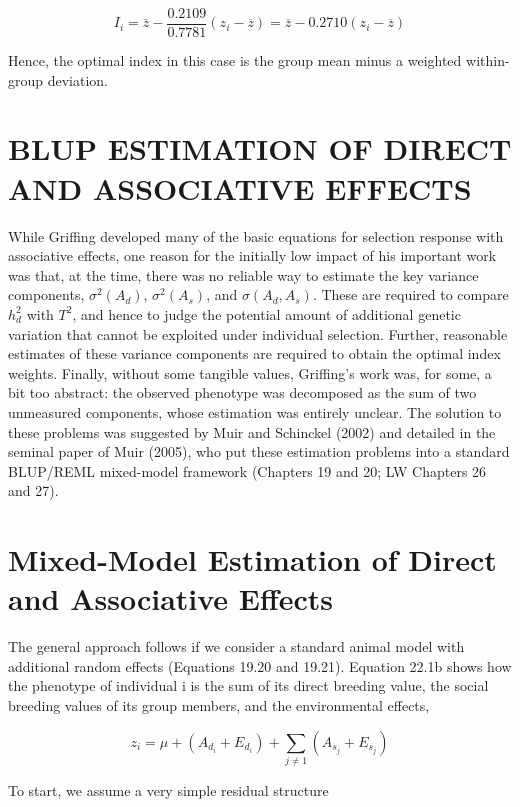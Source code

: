\documentclass{article}
\begin{document}
\begin{equation}
I_{i}=\overline{z}-\frac{0.2109}{0.7781}\left(z_{i}-\overline{z}\right)=\overline{z}-0.2710\left(z_{i}-\overline{z}\right)
\end{equation}

Hence, the optimal index in this case is the group mean minus a weighted within-group deviation.

\section{BLUP ESTIMATION OF DIRECT AND ASSOCIATIVE EFFECTS}
While Griffing developed many of the basic equations for selection response with associative effects, one reason for the initially low impact of his important work was that, at the time, there was no reliable way to estimate the key variance components,  $ \sigma^2(A_d) $,  $ \sigma^2(A_s) $, and  $ \sigma(A_d, A_s) $. These are required to compare  $ h_d^2 $ with  $ T^2 $, and hence to judge the potential amount of additional genetic variation that cannot be exploited under individual selection. Further, reasonable estimates of these variance components are required to obtain the optimal index weights. Finally, without some tangible values, Griffing's work was, for some, a bit too abstract: the observed phenotype was decomposed as the sum of two unmeasured components, whose estimation was entirely unclear. The solution to these problems was suggested by Muir and Schinckel (2002) and detailed in the seminal paper of Muir (2005), who put these estimation problems into a standard BLUP/REML mixed-model framework (Chapters 19 and 20; LW Chapters 26 and 27).

\section{Mixed-Model Estimation of Direct and Associative Effects}
The general approach follows if we consider a standard animal model with additional random effects (Equations 19.20 and 19.21). Equation 22.1b shows how the phenotype of individual i is the sum of its direct breeding value, the social breeding values of its group members, and the environmental effects,

\begin{equation}
z_{i}=\mu+\left(A_{d_{i}}+E_{d_{i}}\right)+\sum_{j\neq1}\left(A_{s_{j}}+E_{s_{j}}\right)
\tag{22.38a}
\label{eq:22_38a}
\end{equation}

To start, we assume a very simple residual structure
\end{document}
